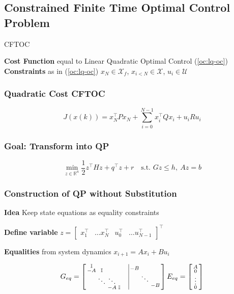 \subsection{Constrained Finite Time Optimal Control Problem}

\begin{sstTitleBox}{
		CFTOC
	}
	\begin{sstOnlyFrame}
		\textbf{Cost Function} equal to
		Linear Quadratic Optimal Control (\ref{oc:lq-oc})
		\textbf{Constraints}
		as in (\ref{oc:lq-oc})
		\ssthl{ + }
		$ x_N      \in \mathcal{X}_f$,
		$ x_{i<N}  \in \mathcal{X}$,
		$ u_i      \in \mathcal{U}$
	\end{sstOnlyFrame}

\end{sstTitleBox}

\subsubsection{Quadratic Cost CFTOC}
\[
	J(x(k)) = x_N^\top P x_N + \sum_{i=0}^{N-1}x_i^\top Q x_i + u_i R u_i
\]
\subsubsection{Goal: Transform  into QP}
\[
	\min_{z\in\mathbb{R}^n}
	\textstyle\frac{1}{2}z^\top H z + q^\top z + r
	\quad\text{s.t. }Gz\leq h,\ Az = b\]

\subsubsection{Construction of QP without Substitution}

\textbf{Idea} Keep state equations as equality constraints

\textbf{Define variable} $z =
	\begin{bmatrix}
		x_1^\top & \dots x_N^\top & u_0^\top & \dots u_{N-1}^\top
	\end{bmatrix}^\top$

\textbf{Equalities} from system dynamics
$x_{i+1} = Ax_i + Bu_i$

\[
	G_{eq} =
	\begin{bmatrix}
		\begin{smallmatrix}
			\mathbb{I}& & & \\
			-A & \mathbb{I} && \\
			&  \ddots & \ddots \\
			&&-A & \mathbb{I}
		\end{smallmatrix}
		 & \vline
		\begin{smallmatrix}
			-B \\
			& \ddots \\
			& &-B
		\end{smallmatrix}
	\end{bmatrix}
	E_{eq} =
	\begin{bsmallmatrix}
		A      \\
		0      \\
		\vdots \\
		0
	\end{bsmallmatrix}
\]

